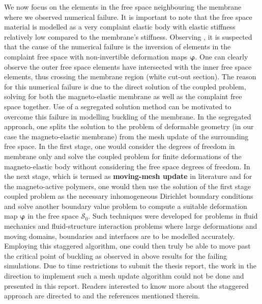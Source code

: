 We now focus on the elements in the free space neighbouring the membrane where we observed numerical failure. It is important to note that the free space material is modelled as a very complaint elastic body with elastic stiffness relatively low compared to the membrane's stiffness. Observing , it is suspected that the cause of the numerical failure is the inversion of elements in the complaint free space with non-invertible deformation maps $\bm{\varphi}$. One can clearly observe the outer free space elements have intersected with the inner free space elements, thus crossing the membrane region (white cut-out section). The reason for this numerical failure is due to the direct solution of the coupled problem, solving for both the magneto-elastic membrane as well as the complaint free space together. Use of a segregated solution method can be motivated to overcome this failure in modelling buckling of the membrane. In the segregated approach, one splits the solution to the problem of deformable geometry (in our case the magneto-elastic membrane) from the mesh update of the surrounding free space. In the first stage, one would consider the degrees of freedom in membrane only and solve the coupled problem for finite deformations of the magneto-elastic body without considering the free space degrees of freedom. In the next stage, which is termed as \textbf{moving-mesh update} in literature \cite{bustamante2011numerical} and \cite{pelteret2016} for the magneto-active polymers, one would then use the solution of the first stage coupled problem as the necessary inhomogeneous Dirichlet boundary conditions and solve another boundary value problem to compute a suitable deformation map $\bm{\varphi}$ in the free space $\mathcal{S}_0$. Such techniques were developed for problems in fluid mechanics and fluid-structure interaction problems where large deformations and moving domains, boundaries and interfaces are to be modelled accurately. Employing this staggered algorithm, one could then truly be able to move past the critical point of buckling as observed in above results for the failing simulations. Due to time restrictions to submit the thesis report, the work in the direction to implement such a mesh update algorithm could not be done and presented in this report. Readers interested to know more about the staggered approach are directed to \cite[see][Sec. 7]{pelteret2016} and the references mentioned therein. \par 

